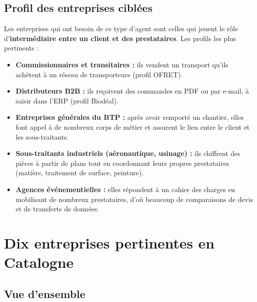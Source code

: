 \documentclass[11pt,a4paper]{article}
\begin{document}
\subsection{Profil des entreprises ciblées}
Les entreprises qui ont besoin de ce type d'agent sont celles qui jouent le rôle d'\textbf{intermédiaire entre un client et des prestataires}. Les profils les plus pertinents :
\begin{itemize}
  \item \textbf{Commissionnaires et transitaires :} ils vendent un transport qu'ils achètent à un réseau de transporteurs (profil OFRET).
  \item \textbf{Distributeurs B2B :} ils reçoivent des commandes en PDF ou par e-mail, à saisir dans l'ERP (profil Biodéal).
  \item \textbf{Entreprises générales du BTP :} après avoir remporté un chantier, elles font appel à de nombreux corps de métier et assurent le lien entre le client et les sous-traitants.
  \item \textbf{Sous-traitants industriels (aéronautique, usinage) :} ils chiffrent des pièces à partir de plans tout en coordonnant leurs propres prestataires (matière, traitement de surface, peinture).
  \item \textbf{Agences événementielles :} elles répondent à un cahier des charges en mobilisant de nombreux prestataires, d'où beaucoup de comparaisons de devis et de transferts de données.
\end{itemize}

\section{Dix entreprises pertinentes en Catalogne}

\subsection{Vue d'ensemble}
\end{document}
